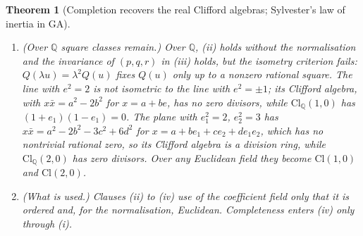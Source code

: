 \documentclass[11pt]{article}
\newtheorem{theorem}{Theorem}[section]
\theoremstyle{definition}
\theoremstyle{plain}
\providecommand{\Cl}{}\renewcommand{\Cl}{\mathrm{Cl}}
\providecommand{\Q}{}\renewcommand{\Q}{\mathbb{Q}}
\begin{document}
\begin{theorem}[Completion recovers the real Clifford algebras; Sylvester's law of inertia in GA]
\begin{enumerate}
\item[(v)] \emph{(Over $\Q$ square classes remain.)} Over $\Q$, (ii) holds without the normalisation and the invariance of $(p, q, r)$ in (iii) holds, but the isometry criterion fails: $Q(\lambda u) = \lambda^{2}Q(u)$ fixes $Q(u)$ only up to a nonzero rational square. The line with $e^{2} = 2$ is not isometric to the line with $e^{2} = \pm 1$; its Clifford algebra, with $x\bar{x} = a^{2} - 2b^{2}$ for $x = a + be$, has no zero divisors, while $\Cl_{\Q}(1,0)$ has $(1 + e_{1})(1 - e_{1}) = 0$. The plane with $e_{1}^{2} = 2$, $e_{2}^{2} = 3$ has $x\bar{x} = a^{2} - 2b^{2} - 3c^{2} + 6d^{2}$ for $x = a + be_{1} + ce_{2} + de_{1}e_{2}$, which has no nontrivial rational zero, so its Clifford algebra is a division ring, while $\Cl_{\Q}(2,0)$ has zero divisors. Over any Euclidean field they become $\Cl(1,0)$ and $\Cl(2,0)$.
\item[(vi)] \emph{(What is used.)} Clauses (ii) to (iv) use of the coefficient field only that it is ordered and, for the normalisation, Euclidean. Completeness enters (iv) only through (i).
\end{enumerate}
\end{theorem}
\end{document}
